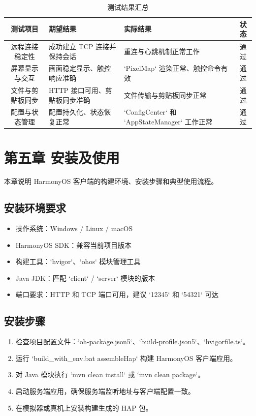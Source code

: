 \documentclass[12pt,a4paper]{article}
\begin{document}
\begin{table}[H]
    \centering
    \begin{tabular}{|c|p{5cm}|p{5cm}|c|}
    \hline
    \textbf{测试项目} & \textbf{期望结果} & \textbf{实际结果} & \textbf{状态} \\
    \hline
    远程连接稳定性 & 成功建立 TCP 连接并保持会话 & 重连与心跳机制正常工作 & 通过 \\
    \hline
    屏幕显示与交互 & 画面稳定显示、触控响应准确 & `PixelMap` 渲染正常、触控命令有效 & 通过 \\
    \hline
    文件与剪贴板同步 & HTTP 接口可用、剪贴板同步准确 & 文件传输与剪贴板同步正常 & 通过 \\
    \hline
    配置与状态管理 & 配置持久化、状态恢复正常 & `ConfigCenter` 和 `AppStateManager` 工作正常 & 通过 \\
    \hline
    \end{tabular}
    \caption{测试结果汇总}
\end{table}

\section{第五章 安装及使用}

本章说明 HarmonyOS 客户端的构建环境、安装步骤和典型使用流程。

\subsection{安装环境要求}

\begin{itemize}
    \item 操作系统：Windows / Linux / macOS
    \item HarmonyOS SDK：兼容当前项目版本
    \item 构建工具：`hvigor`、`ohos` 模块管理工具
    \item Java JDK：匹配 `client` / `server` 模块的版本
    \item 端口要求：HTTP 和 TCP 端口可用，建议 `12345` 和 `54321` 可达
\end{itemize}

\subsection{安装步骤}

\begin{enumerate}
    \item 检查项目配置文件：`oh-package.json5`、`build-profile.json5`、`hvigorfile.ts`。
    \item 运行 `build_with_env.bat assembleHap` 构建 HarmonyOS 客户端应用。
    \item 对 Java 模块执行 `mvn clean install` 或 `mvn clean package`。
    \item 启动服务端应用，确保服务端监听地址与客户端配置一致。
    \item 在模拟器或真机上安装构建生成的 HAP 包。
\end{enumerate}
\end{document}
